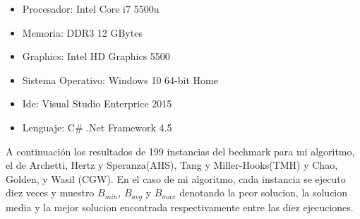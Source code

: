 \begin{itemize}
  \item Procesador: Intel Core i7 5500u
  \item Memoria: DDR3 12 GBytes
  \item Graphics: Intel HD Graphics 5500
  \item Sistema Operativo: Windows 10 64-bit Home
  \item Ide: Visual Studio Enterprice 2015
  \item Lenguaje: C\# .Net Framework 4.5
\end{itemize}

\bigskip

A continuación los resultados de 199 instancias del bechmark para mi algoritmo, el de Archetti, Hertz y Speranza(AHS), Tang y Miller-Hooks(TMH) y Chao, Golden, y Wasil (CGW). En el caso de mi algoritmo, cada instancia se ejecuto diez veces y muestro $B_{min}$, $B_{avg}$ y $B_{max}$ denotando la peor solucion, la solucion media y la mejor solucion encontrada respectivamente entre las diez ejecuciones.


